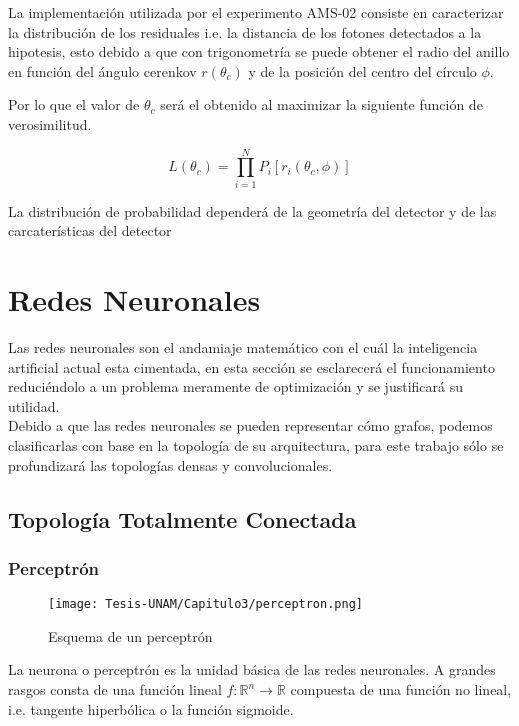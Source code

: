 La implementación utilizada por el experimento AMS-02 consiste en caracterizar la distribución de los residuales i.e. la distancia de los fotones detectados a la hipotesis\cite{barao2007amsrich, BARAO2003310}, esto debido a que con trigonometría se puede obtener el radio del anillo en función del ángulo cerenkov $r(\theta_c)$ y de la posición del centro del círculo $\phi$.

Por lo que el valor de $\theta_c$ será el obtenido al maximizar la siguiente función de verosimilitud.\cite{barao2007amsrich, BARAO2003310}

\begin{equation}
    L(\theta_c) = \prod_{i=1}^N P_i \left[ r_i(\theta_c, \phi) \right]
\end{equation}

La distribución de probabilidad dependerá de la geometría del detector y de las carcaterísticas del detector

\section{Redes Neuronales}
Las redes neuronales son el andamiaje matemático con el cuál la inteligencia artificial actual esta cimentada, en esta sección se esclarecerá el funcionamiento reduciéndolo a un problema meramente de optimización y se justificará su utilidad.\\

Debido a que las redes neuronales se pueden representar cómo grafos, podemos clasificarlas con base en la topología de su arquitectura, para este trabajo sólo se profundizará las topologías densas y convolucionales.

\subsection{Topología Totalmente Conectada}

\subsubsection{Perceptrón}
\begin{figure}[h!]
    \centering
    \texttt{[image: Tesis-UNAM/Capitulo3/perceptron.png]}
    \caption{Esquema de un perceptrón}
    \label{fig:enter-label}
\end{figure}

La neurona o perceptrón es la unidad básica de las redes neuronales. A grandes rasgos consta de una función lineal $f:\mathbb{R}^n\xrightarrow{}\mathbb{R}$ compuesta de una función no lineal, i.e. tangente hiperbólica o la función sigmoide.


